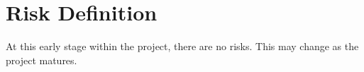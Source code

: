 \section{Risk Definition} 

At this early stage within the project, there are no risks. This may change as the project matures.